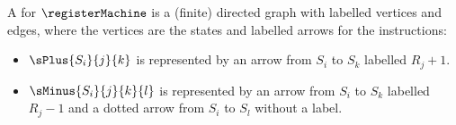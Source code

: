 \begin{definition}
    A  for \(\registerMachine\) is a (finite) directed graph with labelled vertices and edges, where the vertices are the states and labelled arrows for the instructions:
    \begin{itemize}
        \item \(\sPlus{S_i}{j}{k}\) is represented by an arrow from \(S_i\) to \(S_k\) labelled \(R_j + 1\).
        
        \begin{center}
        \end{center}

        \item \(\sMinus{S_i}{j}{k}{l}\) is represented by an arrow from \(S_i\) to \(S_k\) labelled \(R_j - 1\) and a dotted arrow from \(S_i\) to \(S_l\) without a label.
        
        \begin{center}
        \end{center}
    \end{itemize}
\end{definition}

